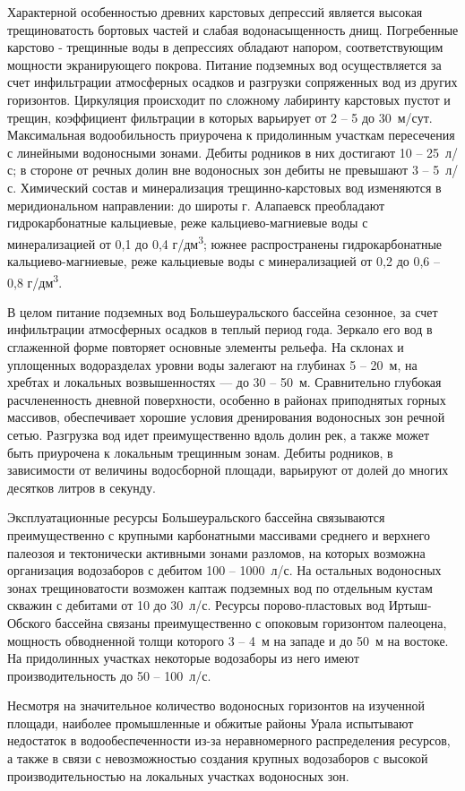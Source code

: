 Характерной особенностью древних карстовых депрессий является высокая трещиноватость бортовых частей и слабая водонасыщенность днищ. Погребенные карстово - трещинные воды в депрессиях обладают напором, соответствующим мощности экранирующего покрова. Питание подземных вод осуществляется за счет инфильтрации атмосферных осадков и разгрузки сопряженных вод из других горизонтов. Циркуляция происходит по сложному лабиринту карстовых пустот и трещин, коэффициент фильтрации в которых варьирует от 2  --  5 до 30~м/сут. Максимальная водообильность приурочена к придолинным участкам пересечения с линейными водоносными зонами. Дебиты родников в них достигают 10  --  25~л/с; в стороне от речных долин вне водоносных зон дебиты не превышают 3  --  5~л/с. Химический состав и минерализация трещинно-карстовых вод изменяются в меридиональном направлении: до широты г. Алапаевск преобладают гидрокарбонатные кальциевые, реже кальциево-магниевые воды с минерализацией от 0,1 до 0,4 г/дм\textsuperscript{3}; южнее распространены гидрокарбонатные кальциево-магниевые, реже кальциевые воды с минерализацией от 0,2 до 0,6 -- 0,8 г/дм\textsuperscript{3}.

В целом питание подземных вод Большеуральского бассейна сезонное, за счет инфильтрации атмосферных осадков в теплый период года. Зеркало его вод в сглаженной форме повторяет основные элементы рельефа. На склонах и уплощенных водоразделах уровни воды залегают на глубинах 5  --  20~м, на хребтах и локальных возвышенностях  ---  до 30  --  50~м. Сравнительно глубокая расчлененность дневной поверхности, особенно в районах приподнятых горных массивов, обеспечивает хорошие условия дренирования водоносных зон речной сетью. Разгрузка вод идет преимущественно вдоль долин рек, а также может быть приурочена к локальным трещинным зонам. Дебиты родников, в зависимости от величины водосборной площади, варьируют от долей до многих десятков литров в секунду.

Эксплуатационные ресурсы Большеуральского бассейна связываются преимущественно с крупными карбонатными массивами среднего и верхнего палеозоя и тектонически активными зонами разломов, на которых возможна организация водозаборов с дебитом 100  --  1000~л/с. На остальных водоносных зонах трещиноватости возможен каптаж подземных вод по отдельным кустам скважин с дебитами от 10 до 30~л/с. Ресурсы порово-пластовых вод Иртыш-Обского бассейна связаны преимущественно с опоковым горизонтом палеоцена, мощность обводненной толщи которого 3  --  4~м на западе и до 50~м на востоке. На придолинных участках некоторые водозаборы из него имеют производительность до 50 -- 100~л/с.

Несмотря на значительное количество водоносных горизонтов на изученной площади, наиболее промышленные и обжитые районы Урала испытывают недостаток в водообеспеченности из-за неравномерного распределения ресурсов, а также в связи с невозможностью создания крупных водозаборов с высокой производительностью на локальных участках водоносных зон.
